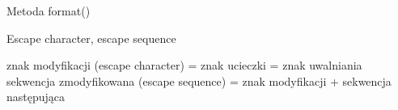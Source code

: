 \begin{frame}{Metoda format()}
    
\end{frame}

\begin{frame}{Escape character, escape sequence}
    \begin{center}
        znak modyfikacji (escape character) = znak ucieczki = znak uwalniania \\
        sekwencja zmodyfikowana (escape sequence) = znak modyfikacji + sekwencja następująca \\
    \end{center}
    
\end{frame}
